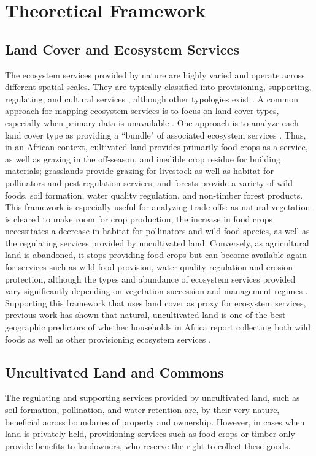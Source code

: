 \documentclass{article}
\begin{document}
\section{Theoretical Framework}

\subsection{Land Cover and Ecosystem Services}
The ecosystem services provided by nature are highly varied and operate across different spatial scales.  They are typically classified into provisioning, supporting, regulating, and cultural services \cite{Martinez-Harms2012}, although other typologies exist \cite{Fisher2008}.  A common approach for mapping ecosystem services is to focus on land cover types, especially when primary data is unavailable \cite{Martinez-Harms2012}.  One approach is to analyze each land cover type as providing a ``bundle" of associated ecosystem services \cite{Raudsepp-Hearne2010}.  Thus, in an African context, cultivated land provides primarily food crops as a service, as well as grazing in the off-season, and inedible crop residue for building materials; grasslands provide grazing for livestock as well as habitat for pollinators and pest regulation services; and forests provide a variety of wild foods, soil formation, water quality regulation, and non-timber forest products.  This framework is especially useful for analyzing trade-offs: as natural vegetation is cleared to make room for crop production, the increase in food crops necessitates a decrease in habitat for pollinators and wild food species, as well as the regulating services provided by uncultivated land.  Conversely, as agricultural land is abandoned, it stops providing food crops but can become available again for services such as wild food provision, water quality regulation and erosion protection, although the types and abundance of ecosystem services provided vary significantly depending on vegetation succession and management regimes \cite{wessels2019mapping}.  Supporting this framework that uses land cover as proxy for ecosystem services, previous work has shown that natural, uncultivated land is one of the best geographic predictors of whether households in Africa report collecting both wild foods as well as other provisioning ecosystem services \cite{Cooper2018a}.

\subsection{Uncultivated Land and Commons}
The regulating and supporting services provided by uncultivated land, such as soil formation, pollination, and water retention are, by their very nature, beneficial across boundaries of property and ownership.  However, in cases when land is privately held, provisioning services such as food crops or timber only provide benefits to landowners, who reserve the right to collect these goods.  
\end{document}
